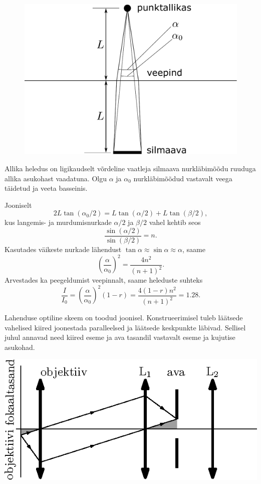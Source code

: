 \documentclass[10pt]{article}
\begin{document}
{
\solu
\begin{figure}
	\begin{center}
		\includegraphics[width=0.95\linewidth]{2008-v3g-05-lah}
	\end{center}
\end{figure}
Allika heledus on ligikaudselt võrdeline vaatleja silmaava nurkläbimõõdu ruuduga allika asukohast vaadatuna. Olgu $\alpha$ ja $\alpha_0$ nurkläbimõõdud vastavalt veega täidetud ja veeta basseinis.

Jooniselt
\[
2L\tan (\alpha_0 /2) = L\tan (\alpha /2) + L\tan (\beta /2),
\]
kus langemis- ja murdumisnurkade $\alpha /2$ ja $\beta /2$ vahel kehtib seos
\[
\frac{\sin(\alpha/2)}{\sin(\beta/2)} = n.
\]
Kasutades väikeste nurkade lähendust $\tan\alpha\approx\sin\alpha\approx\alpha$, saame 
\[
\left(\frac{\alpha}{\alpha_0}\right)^2 = \frac{4n^2}{(n+1)^2}.
\]
Arvestades ka peegeldumist veepinnalt, saame heleduste suhteks
\[
\frac{I}{I_{0}}=\left(\frac{\alpha}{\alpha_0}\right)^2(1-r) = \frac{4(1-r) n^{2}}{(n+1)^{2}}=\num{1,28}.
\]
\probend
\bigskip


\solu
Lahenduse optiline skeem on toodud joonisel. Konstrueerimisel tuleb
läätsede vahelised kiired joonestada paralleelsed ja läätsede keskpunkte läbivad.
Sellisel juhul annavad need kiired eseme ja ava tasandil vastavalt eseme ja kujutise
asukohad.

\begin{center}
	\includegraphics[width=0.8\linewidth]{2009-v3g-07-G_konfokaalne_mikroskoop_lah.eps}
\end{center}

}
\end{document}
